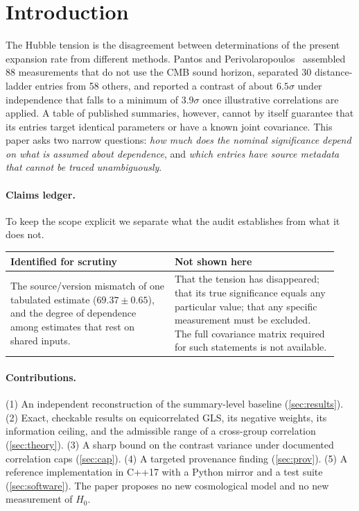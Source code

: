 \documentclass[11pt,a4paper]{article}
\theoremstyle{remark}\newtheorem{remark}{Remark}
\newcommand{\Hz}{H_0}\newcommand{\one}{\bm{1}}
\begin{document}
\section{Introduction}
The Hubble tension is the disagreement between determinations of the present expansion rate from different methods. Pantos and Perivolaropoulos~\cite{PantosPerivolaropoulos2026} assembled 88 measurements that do not use the CMB sound horizon, separated 30 distance-ladder entries from 58 others, and reported a contrast of about $6.5\sigma$ under independence that falls to a minimum of $3.9\sigma$ once illustrative correlations are applied. A table of published summaries, however, cannot by itself guarantee that its entries target identical parameters or have a known joint covariance. This paper asks two narrow questions: \emph{how much does the nominal significance depend on what is assumed about dependence}, and \emph{which entries have source metadata that cannot be traced unambiguously}.

\paragraph{Claims ledger.}
To keep the scope explicit we separate what the audit establishes from what it does not.
\begin{center}\small
\begin{tabular}{@{}p{0.47\linewidth}p{0.47\linewidth}@{}}
\toprule
\textbf{Identified for scrutiny} & \textbf{Not shown here}\\\midrule
The source/version mismatch of one tabulated estimate ($69.37\pm0.65$), and the degree of dependence among estimates that rest on shared inputs. &
That the tension has disappeared; that its true significance equals any particular value; that any specific measurement must be excluded. The full covariance matrix required for such statements is not available.\\\bottomrule
\end{tabular}
\end{center}

\paragraph{Contributions.}
(1) An independent reconstruction of the summary-level baseline (\cref{sec:results}). (2) Exact, checkable results on equicorrelated GLS, its negative weights, its information ceiling, and the admissible range of a cross-group correlation (\cref{sec:theory}). (3) A sharp bound on the contrast variance under documented correlation caps (\cref{sec:cap}). (4) A targeted provenance finding (\cref{sec:prov}). (5) A reference implementation in C++17 with a Python mirror and a test suite (\cref{sec:software}). The paper proposes no new cosmological model and no new measurement of $\Hz$.
\end{document}
